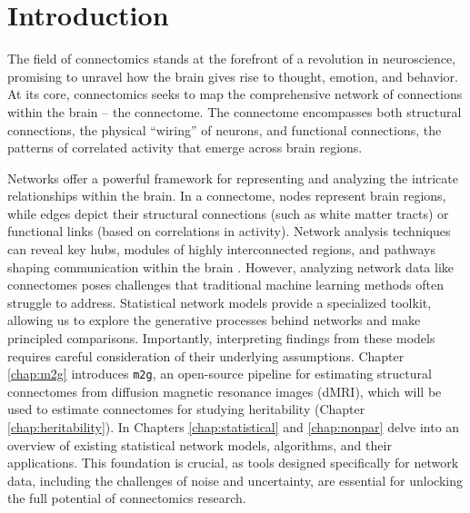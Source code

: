 \chapter{Introduction} \label{chap-intro}

The field of connectomics stands at the forefront of a revolution in neuroscience, promising to unravel how the brain gives rise to thought, emotion, and behavior. At its core, connectomics seeks to map the comprehensive network of connections within the brain – the connectome. The connectome encompasses both structural connections, the physical ``wiring'' of neurons, and functional connections, the patterns of correlated activity that emerge across brain regions. 

Networks offer a powerful framework for representing and analyzing the intricate relationships within the brain. In a connectome, nodes represent brain regions, while edges depict their structural connections (such as white matter tracts) or functional links (based on correlations in activity). Network analysis techniques can reveal key hubs, modules of highly interconnected regions, and pathways shaping communication within the brain \cite{sporns2005human, behrens2012human, van2016comparative, fornito2015connectomics, griffa2013structural}. However, analyzing network data like connectomes poses challenges that traditional machine learning methods often struggle to address. Statistical network models provide a specialized toolkit, allowing us to explore the generative processes behind networks and make principled comparisons. Importantly, interpreting findings from these models requires careful consideration of their underlying assumptions. Chapter \ref{chap:m2g} introduces \texttt{m2g}, an open-source pipeline for estimating structural connectomes from diffusion magnetic resonance images (dMRI), which will be used to estimate connectomes for studying heritability (Chapter \ref{chap:heritability}). In Chapters \ref{chap:statistical} and \ref{chap:nonpar} delve into an overview of existing statistical network models, algorithms, and their applications. This foundation is crucial, as tools designed specifically for network data, including the challenges of noise and uncertainty, are essential for unlocking the full potential of connectomics research.

